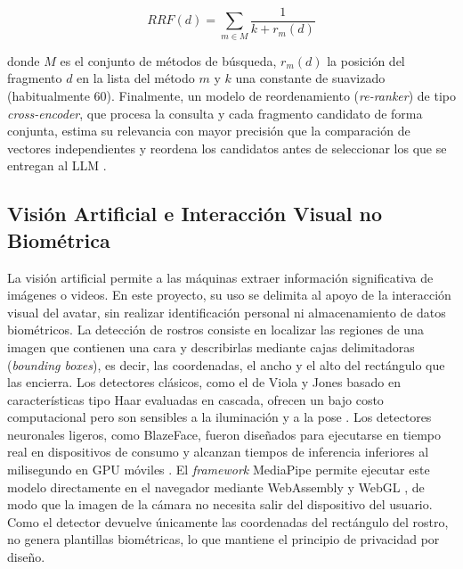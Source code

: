 \begin{equation}
\label{eq:rrf}
RRF(d) = \sum_{m \in M} \frac{1}{k + r_m(d)}
\end{equation}

donde $M$ es el conjunto de métodos de búsqueda, $r_m(d)$ la posición del fragmento $d$ en la lista del método $m$ y $k$ una constante de suavizado (habitualmente 60). Finalmente, un modelo de reordenamiento (\textit{re-ranker}) de tipo \textit{cross-encoder}, que procesa la consulta y cada fragmento candidato de forma conjunta, estima su relevancia con mayor precisión que la comparación de vectores independientes y reordena los candidatos antes de seleccionar los que se entregan al LLM \cite{bonifacio2021mmarco}.

\subsection{Visión Artificial e Interacción Visual no Biométrica}
La visión artificial permite a las máquinas extraer información significativa de imágenes o videos. En este proyecto, su uso se delimita al apoyo de la interacción visual del avatar, sin realizar identificación personal ni almacenamiento de datos biométricos. La detección de rostros consiste en localizar las regiones de una imagen que contienen una cara y describirlas mediante cajas delimitadoras (\textit{bounding boxes}), es decir, las coordenadas, el ancho y el alto del rectángulo que las encierra. Los detectores clásicos, como el de Viola y Jones basado en características tipo Haar evaluadas en cascada, ofrecen un bajo costo computacional pero son sensibles a la iluminación y a la pose \cite{viola2001rapid}. Los detectores neuronales ligeros, como BlazeFace, fueron diseñados para ejecutarse en tiempo real en dispositivos de consumo y alcanzan tiempos de inferencia inferiores al milisegundo en GPU móviles \cite{bazarevsky2019blazeface}. El \textit{framework} MediaPipe permite ejecutar este modelo directamente en el navegador mediante WebAssembly y WebGL \cite{lugaresi2019mediapipe}, de modo que la imagen de la cámara no necesita salir del dispositivo del usuario. Como el detector devuelve únicamente las coordenadas del rectángulo del rostro, no genera plantillas biométricas, lo que mantiene el principio de privacidad por diseño.

